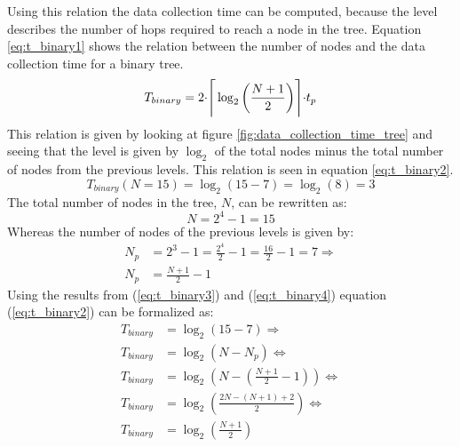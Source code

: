 
Using this relation the data collection time can be computed, because the level describes the number of hops required to reach a node in the tree. Equation \ref{eq:t_binary1} shows the relation between the number of nodes and the data collection time for a binary tree.
\begin{equation}
	T_{binary} = 2{\cdot}{\Bigg{\lceil}}\log_2{\left(\frac{N+1}{2}\right)}{\Bigg{\rceil}}{\cdot}t_p
	\label{eq:t_binary1}
\end{equation}
This relation is given by looking at figure \ref{fig:data_collection_time_tree} and seeing that the level is given by $\log_2$ of the total nodes minus the total number of nodes from the previous levels. This relation is seen in equation \ref{eq:t_binary2}.
\newpage
\begin{equation}
	T_{binary}(N=15) = \log_2{(15-7)} = \log_2{(8)} = 3
	\label{eq:t_binary2}
\end{equation}
The total number of nodes in the tree, $N$, can be rewritten as:
\begin{equation}
	N = 2^4-1 = 15
	\label{eq:t_binary3}
\end{equation}
Whereas the number of nodes of the previous levels is given by:
\begin{equation} 
	\begin{aligned}
		N_p &= 2^3 - 1 = \frac{2^4}{2}-1 = \frac{16}{2} -1 = 7 \Rightarrow\\
		N_p &= \frac{N+1}{2} -1
	\end{aligned}
	\label{eq:t_binary4}
\end{equation}
Using the results from (\ref{eq:t_binary3}) and (\ref{eq:t_binary4}) equation (\ref{eq:t_binary2}) can be formalized as:
\begin{equation}
\begin{aligned}
	T_{binary} &= \log_2{(15-7)} \Rightarrow\\
    T_{binary} &= \log_2{(N-N_p)} \Leftrightarrow\\
	T_{binary} &= \log_2{\left(N-\left(\frac{N+1}{2}-1\right)\right)} \Leftrightarrow\\
	T_{binary} &= \log_2{\left(\frac{2N-(N+1)+2}{2}\right)} \Leftrightarrow\\
	T_{binary} &= \log_2{\left(\frac{N+1}{2}\right)}
	\end{aligned}
\end{equation}

